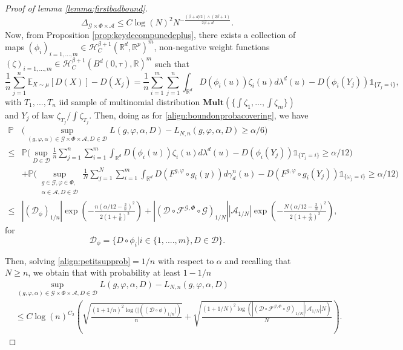 \documentclass[10pt]{article}
\begin{document}
\begin{proof}[Proof of lemma \ref{lemma:firstbadbound}]
\begin{equation}
\Delta_{\mathcal{G}\times \Phi \times \mathcal{A}}\leq C\log(N)^2N^{-\frac{(\beta + d/2)\wedge (2\beta+1)}{2\beta+d}}.
\end{equation}
Now, from Proposition \ref{prop:keydecompunedeplus}, there exists a collection of maps $(\phi_i)_{i=1,...,m}\in\mathcal{H}^{\beta+1}_{C}(\mathbb{R}^d,\mathbb{R}^p)^m$, non-negative weight functions $(\zeta)_{i=1,...,m}\in\mathcal{H}^{\beta+1}_{C}(B^d(0,\tau),\mathbb{R})^m$ such that
$$
\frac{1}{n}\sum_{j=1}^n \mathbb{E}_{X\sim \mu}[ D(X)]-  D(X_j)=\frac{1}{n}\sum \limits_{i=1}^m\sum_{j=1}^n  \int_{\mathbb{R}^d}D(\phi_i(u))\zeta_i(u)d\lambda^d(u)-D(\phi_i(Y_j))\mathds{1}_{\{T_j=i\}},
$$
with $T_1, ..., T_n$ iid sample of multinomial distribution $\textbf{Mult}(\{\int \zeta_1,...,\int\zeta_m\})$ and $Y_j$ of law $\zeta_{T_j}/{\int \zeta_{T_j}}$. Then, doing as for \eqref{align:boundonprobacovering}, we have 
\begin{align}\label{align:petitsupprob}
    \mathbb{P}&\Big(\sup_{(g,\varphi,\alpha)\in \mathcal{G}\times  \Phi\times \mathcal{A},D\in \mathcal{D}} L(g,\varphi,\alpha,D)-L_{N,n}(g,\varphi,\alpha,D)\geq  \alpha/6 \Big)\nonumber\\
    \leq &  \mathbb{P}\Big(\sup \limits_{D\in \mathcal{D} }  \frac{1}{n}\sum_{j=1}^n  \sum_{i=1}^m\int_{\mathbb{R}^d}D(\phi_i(u))\zeta_i(u)d\lambda^d(u)-D(\phi_i(Y_j))\mathds{1}_{\{T_j=i\}}\geq \alpha/12 \Big)\nonumber\\
    &+ \mathbb{P}\Big(\sup_{\substack{g\in \mathcal{G},\varphi\in \Phi,\\\alpha\in \mathcal{A},D\in \mathcal{D}}} \frac{1}{N} \sum_{j=1}^N \sum_{i=1}^m \int_{\mathbb{R}^d} D(F^{g,\varphi}\circ g_{i}(y))d\gamma_d^n(u)- D(F^{g,\varphi}\circ g_{i}(Y_j))\mathds{1}_{\{\omega_j=i\}}\geq \alpha/12 \Big)\nonumber\\
    \leq & |(\mathcal{D}_{\phi})_{1/n}|  \exp\left(-\frac{n(\alpha/12 -\frac{2}{n})^2}{2(1+\frac{2}{n})^2}\right) +|(\mathcal{D}\circ\mathcal{F}^{\mathcal{G},\Phi}\circ \mathcal{G})_{1/N}||\mathcal{A}_{1/N}|\exp\left(-\frac{N(\alpha/12 -\frac{2}{N})^2}{2(1+\frac{2}{N})^2}\right),
\end{align}
for $$\mathcal{D}_{\phi}=\big\{D\circ \phi_i|i\in \{1,....,m\},D\in \mathcal{D}\big\}.$$

Then, solving \eqref{align:petitsupprob}$=1/n$ with respect to $\alpha$ and recalling that $N\geq n$, we obtain that with probability at least $1-1/n$
\begin{align*}
&\sup_{(g,\varphi,\alpha)\in \mathcal{G}\times  \Phi\times \mathcal{A},D\in \mathcal{D}} L(g,\varphi,\alpha,D)-L_{N,n}(g,\varphi,\alpha,D)\\
& \leq C\log(n)^{C_2}\left(\sqrt{\frac{(1+1/n)^2\log(|((\mathcal{D}\circ \phi)_{1/n}|)}{n} }+\sqrt{\frac{(1+1/N)^2\log(|(\mathcal{D}\circ\mathcal{F}^{\mathcal{G},\Phi}\circ \mathcal{G})_{1/N}||\mathcal{A}_{1/N}|N)}{N} }\right).
\end{align*}



\end{proof}
\end{document}
